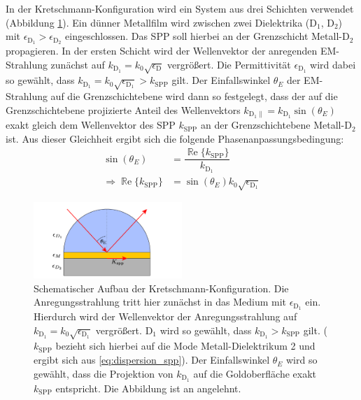 \documentclass[titlepage,  ngerman]{article}
\renewcommand{\Re}{\operatorname{\mathbb{R}e}}
\begin{document}
	In der Kretschmann-Konfiguration wird ein System aus drei Schichten verwendet (Abbildung \ref{fig:kretschman}). Ein dünner Metallfilm wird zwischen zwei Dielektrika ($\mathrm{D}_1$, $\mathrm{D}_2$) mit $\epsilon_{\mathrm{D}_1} > \epsilon_{\mathrm{D}_2}$ eingeschlossen. Das SPP soll hierbei an der Grenzschicht Metall-$\mathrm{D}_2$ propagieren. In der ersten Schicht wird der Wellenvektor der anregenden EM-Strahlung zunächst auf $k_\mathrm{\mathrm{D}_1} = k_0 \sqrt{\epsilon_\mathrm{D}}$ vergrößert. Die Permittivität $\epsilon_{\mathrm{D}_1}$ wird dabei so gewählt, dass $k_\mathrm{\mathrm{D}_1} = k_0 \sqrt{\epsilon_{\mathrm{D}_1}} > k_\mathrm{SPP}$ gilt. Der Einfallswinkel $\theta_E$ der EM-Strahlung auf die Grenzschichtebene wird dann so festgelegt, dass der auf die Grenzschichtebene projizierte Anteil des Wellenvektors $k_{\mathrm{\mathrm{D}_1}\parallel} = k_{\mathrm{\mathrm{D}_1}} \sin(\theta_E)$ exakt gleich dem Wellenvektor des SPP $k_\mathrm{SPP}$ an der Grenzschichtebene Metall-$\mathrm{D}_2$ ist. Aus dieser Gleichheit ergibt sich die folgende Phasenanpassungsbedingung: 
	\begin{align}
		\label{eq:phase_condition_kretschmann}
		\sin(\theta_E) &= \dfrac{\Re\{k_{\mathrm{SPP}}\}}{k_{\mathrm{D}_1}}\\
		\Rightarrow \Re\{k_{\mathrm{SPP}}\} &= \sin(\theta_E) k_0 \sqrt{\epsilon_{\mathrm{D}_1}}
	\end{align}  
	\begin{figure}[h] 
		\centering
		\includegraphics[width=0.5\textwidth]{figures/Kretschmann.pdf}
		\caption[Kretschmann-Konfiguration]{Schematischer Aufbau der Kretschmann-Konfiguration. Die Anregungsstrahlung tritt hier zunächst in das Medium mit $\epsilon_{\mathrm{D}_1}$ ein. Hierdurch wird der Wellenvektor der Anregungsstrahlung auf $k_{\mathrm{D}_1}=k_0\sqrt{\epsilon_{\mathrm{D}_1}}$ vergrößert. $\mathrm{D}_1$ wird so gewählt, dass $k_{\mathrm{D}_1}> k_{\mathrm{SPP}}$ gilt. ($k_{\mathrm{SPP}}$ bezieht sich hierbei auf die Mode Metall-Dielektrikum 2 und ergibt sich aus \eqref{eq:dispersion_spp}). Der Einfallswinkel $\theta_E$ wird so gewählt, dass die Projektion von $k_{\mathrm{D}_1}$ auf die Goldoberfläche exakt $k_{\mathrm{SPP}}$ entspricht. Die Abbildung ist an \cite{Jaruschewski.2020} angelehnt.}
		\label{fig:kretschman}
	\end{figure}
\end{document}
